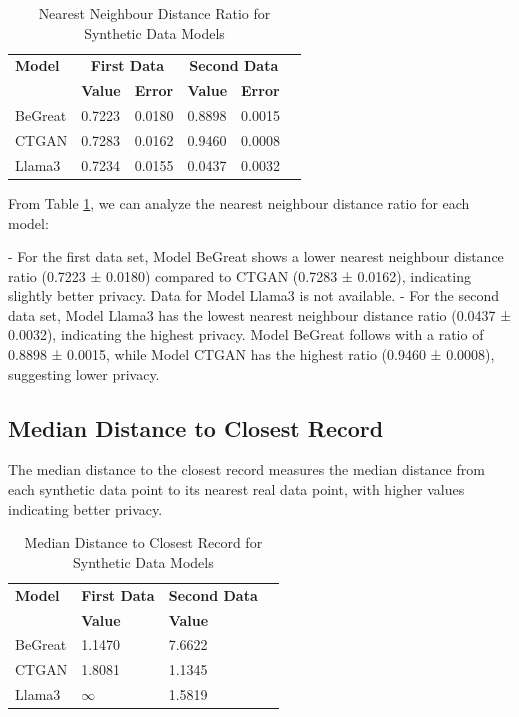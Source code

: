 \begin{table}[H]
\centering
\caption{Nearest Neighbour Distance Ratio for Synthetic Data Models}
\label{tab:nn_distance_ratio_combined}
\begin{tabularx}{\textwidth}{l*{5}{X}}
    \toprule
    \textbf{Model} & \multicolumn{2}{c}{\textbf{First Data}} & \multicolumn{2}{c}{\textbf{Second Data}} \\
    \cmidrule(lr){2-3} \cmidrule(lr){4-5}
    & \textbf{Value} & \textbf{Error} & \textbf{Value} & \textbf{Error} \\
    \midrule
    BeGreat & 0.7223 & 0.0180 & 0.8898 & 0.0015 \\
    CTGAN & 0.7283 & 0.0162 & 0.9460 & 0.0008 \\
    Llama3 & 0.7234 & 0.0155 & 0.0437 & 0.0032 \\
    \bottomrule
\end{tabularx}
\end{table}



From Table \ref{tab:nn_distance_ratio_combined}, we can analyze the nearest neighbour distance ratio for each model:

- For the first data set, Model BeGreat shows a lower nearest neighbour distance ratio (0.7223 ± 0.0180) compared to CTGAN (0.7283 ± 0.0162), indicating slightly better privacy. Data for Model Llama3 is not available.
- For the second data set, Model Llama3 has the lowest nearest neighbour distance ratio (0.0437 ± 0.0032), indicating the highest privacy. Model BeGreat follows with a ratio of 0.8898 ± 0.0015, while Model CTGAN has the highest ratio (0.9460 ± 0.0008), suggesting lower privacy.





\subsection{Median Distance to Closest Record}

The median distance to the closest record measures the median distance from each synthetic data point to its nearest real data point, with higher values indicating better privacy.

\begin{table}[H]
\centering
\caption{Median Distance to Closest Record for Synthetic Data Models}
\label{tab:median_distance_combined}
\begin{tabularx}{\textwidth}{l*{5}{X}}
    \toprule
    \textbf{Model} & \multicolumn{2}{c}{\textbf{First Data}} & \multicolumn{2}{c}{\textbf{Second Data}} \\
    \cmidrule(lr){2-3} \cmidrule(lr){4-5}
    & \textbf{Value} & & \textbf{Value} \\
    \midrule
    BeGreat & 1.1470 & & 7.6622 \\
    CTGAN & 1.8081 & & 1.1345 \\
    Llama3 & \(\infty\) & & 1.5819 \\
    \bottomrule
\end{tabularx}
\end{table}


